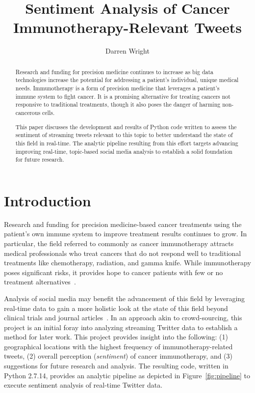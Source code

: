 
\title{Sentiment Analysis of Cancer Immunotherapy-Relevant Tweets}


\author{Darren Wright}

\begin{abstract}
  Research and funding for precision medicine continues to increase as
  big data technologies increase the potential for addressing a
  patient's individual, unique medical needs.  Immunotherapy is a form
  of precision medicine that leverages a patient's immune system to
  fight cancer.  It is a promising alternative for treating cancers
  not responsive to traditional treatments, though it also poses the
  danger of harming non-cancerous cells.

  This paper discusses the development and results of Python code
  written to assess the sentiment of streaming tweets relevant to this
  topic to better understand the state of this field in real-time.
  The analytic pipeline resulting from this effort targets advancing
  improving real-time, topic-based social media analysis to establish
  a solid foundation for future research.
\end{abstract}

\maketitle

\section{Introduction}


Research and funding for precision medicine-based cancer treatments
using the patient's own immune system to improve treatment results
continues to grow.  In particular, the field referred to commonly as
cancer immunotherapy attracts medical professionals who treat cancers
that do not respond well to traditional treatments like chemotherapy,
radiation, and gamma knife.  While immunotherapy poses significant
risks, it provides hope to cancer patients with few or no treatment
alternatives~\cite{hopkins2017}.
	
Analysis of social media may benefit the advancement of this field by
leveraging real-time data to gain a more holistic look at the state of
this field beyond clinical trials and journal
articles~\cite{kaya2017}.  In an approach akin to crowd-sourcing, this
project is an initial foray into analyzing streaming Twitter data to
establish a method for later work.  This project provides insight into
the following: (1) geographical locations with the highest frequency
of immunotherapy-related tweets, (2) overall perception
(\emph{sentiment}) of cancer immunotherapy, and (3) suggestions for
future research and analysis.  The resulting code, written in Python
2.7.14, provides an analytic pipeline as depicted in
Figure~\ref{fig:pipeline} to execute sentiment analysis of real-time
Twitter data.

